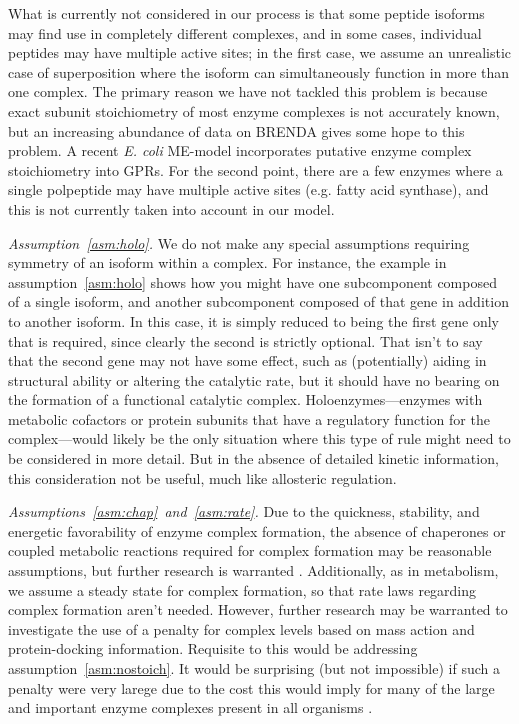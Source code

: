 What is currently not considered in our process is that some peptide
isoforms may find use in completely different complexes, and in some
cases, individual peptides may have multiple active sites; in the
first case, we assume an unrealistic case of superposition where the
isoform can simultaneously function in more than one complex. The
primary reason we have not tackled this problem is because exact
subunit stoichiometry of most enzyme complexes is not accurately
known, but an increasing abundance of data on BRENDA
\citep{Schomburg2013} gives some hope to this problem. A recent
\emph{E. coli} ME-model \citep{O'Brien2013} incorporates putative
enzyme complex stoichiometry into GPRs. For the second point, there
are a few enzymes where a single polpeptide may have multiple active
sites (e.g. fatty acid synthase), and this is not currently taken into
account in our model.

\emph{Assumption~\ref{asm:holo}.}
We do not make any special assumptions requiring symmetry of an
isoform within a complex. For instance, the example in
assumption~\ref{asm:holo} shows how you might have one subcomponent
composed of a single isoform, and another subcomponent composed of
that gene in addition to another isoform. In this case, it is simply
reduced to being the first gene only that is required, since clearly
the second is strictly optional. That isn't to say that the second
gene may not have some effect, such as (potentially) aiding in
structural ability or altering the catalytic rate, but it should have
no bearing on the formation of a functional catalytic
complex. Holoenzymes---enzymes with metabolic cofactors or protein
subunits that have a regulatory function for the complex---would
likely be the only situation where this type of rule might need to be
considered in more detail. But in the absence of detailed kinetic
information, this consideration not be useful, much like allosteric
regulation.

\emph{Assumptions~\ref{asm:chap}~and~\ref{asm:rate}.}
Due to the quickness, stability, and energetic favorability of enzyme
complex formation, the absence of chaperones or coupled metabolic
reactions required for complex formation may be reasonable
assumptions, but further research is warranted \citep{Karr2012}.
Additionally, as in metabolism, we assume a steady state for complex
formation, so that rate laws regarding complex formation aren't
needed. However, further research may be warranted to investigate the
use of a penalty for complex levels based on mass action and
protein-docking information. Requisite to this would be addressing
assumption~\ref{asm:nostoich}. It would be surprising (but not
impossible) if such a penalty were very larege due to the cost this
would imply for many of the large and important enzyme complexes
present in all organisms \citep{Nelson2008}.

